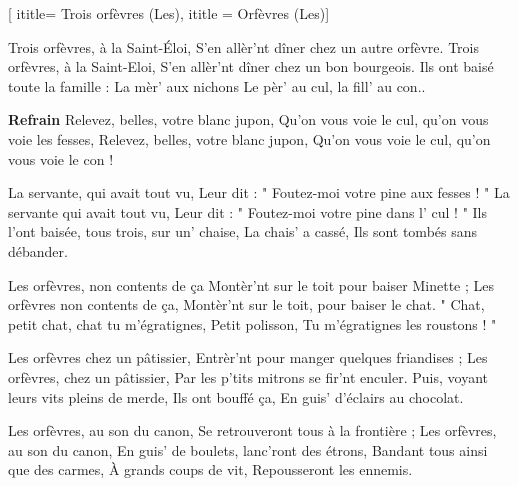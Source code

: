  [
ititle= {Trois orfèvres (Les)},
ititle = {Orfèvres (Les)}]


\beginverse
Trois orfèvres, à la Saint-Éloi,
S'en allèr'nt dîner chez un autre orfèvre.
Trois orfèvres, à la Saint-Eloi,
S'en allèr'nt dîner chez un bon bourgeois.
Ils ont baisé toute la famille :
La mèr' aux nichons
Le pèr' au cul, la fill' au con..
\endverse

\beginchorus
\textbf {Refrain}
Relevez, belles, votre blanc jupon,
Qu'on vous voie le cul, qu'on vous voie les fesses,
Relevez, belles, votre blanc jupon,
Qu'on vous voie le cul, qu'on vous voie le con !
\endchorus

\beginverse
La servante, qui avait tout vu,
Leur dit : " Foutez-moi votre pine aux fesses ! "
La servante qui avait tout vu,
Leur dit : " Foutez-moi votre pine dans l' cul ! "
Ils l'ont baisée, tous trois, sur un' chaise,
La chais' a cassé,
Ils sont tombés sans débander.
\endverse

\beginverse
Les orfèvres, non contents de ça
Montèr'nt sur le toit pour baiser Minette ;
Les orfèvres non contents de ça,
Montèr'nt sur le toit, pour baiser le chat.
" Chat, petit chat, chat tu m'égratignes,
Petit polisson,
Tu m'égratignes les roustons ! "
\endverse

\beginverse
Les orfèvres chez un pâtissier,
Entrèr'nt pour manger quelques friandises ;
Les orfèvres, chez un pâtissier,
Par les p'tits mitrons se fir'nt enculer.
Puis, voyant leurs vits pleins de merde,
Ils ont bouffé ça,
En guis' d'éclairs au chocolat.
\endverse

\beginverse
Les orfèvres, au son du canon,
Se retrouveront tous à la frontière ;
Les orfèvres, au son du canon,
En guis' de boulets, lanc'ront des étrons,
Bandant tous ainsi que des carmes,
À grands coups de vit,
Repousseront les ennemis.
\endverse

\endsong